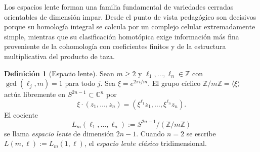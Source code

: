 \documentclass[11pt,a4paper]{article}
\theoremstyle{plain}
\theoremstyle{definition}
\newtheorem{definition}[theorem]{Definición}
\theoremstyle{remark}
\newcommand{\ZZ}{\mathbb Z}
\newcommand{\CC}{\mathbb C}
\begin{document}
Los espacios lente forman una familia fundamental de variedades cerradas
orientables de dimensión impar. Desde el punto de vista pedagógico son
decisivos porque su homología integral se calcula por un complejo celular
extremadamente simple, mientras que su clasificación homotópica exige
información más fina proveniente de la cohomología con coeficientes
finitos y de la estructura multiplicativa del producto de taza.

\begin{definition}[Espacio lente]
\label{def:espacio-lente-apendice}
Sean $m\ge2$ y $\ell_1,\dots,\ell_n\in\ZZ$ con $\gcd(\ell_j,m)=1$ para todo
$j$. Sea $\xi=e^{2\pi i/m}$. El grupo cíclico $\ZZ/m\ZZ=\langle\xi\rangle$
actúa libremente en $S^{2n-1}\subset\CC^n$ por
\[
\xi\cdot(z_1,\dots,z_n)=(\xi^{\ell_1}z_1,\dots,\xi^{\ell_n}z_n).
\]
El cociente
\[
L_m(\ell_1,\dots,\ell_n):=S^{2n-1}/(\ZZ/m\ZZ)
\]
se llama \emph{espacio lente} de dimensión $2n-1$. Cuando $n=2$ se escribe
$L(m,\ell):=L_m(1,\ell)$, el \emph{espacio lente clásico} tridimensional.
\end{definition}
\end{document}
